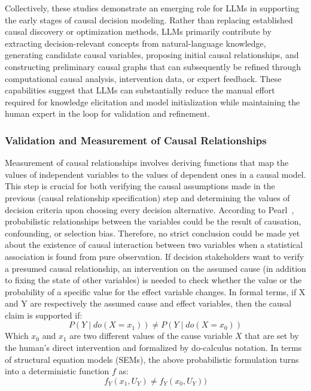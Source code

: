 \documentclass{sfuthesis}
\begin{document}
Collectively, these studies demonstrate an emerging role for LLMs in supporting the early stages of causal decision modeling. Rather than replacing established causal discovery or optimization methods, LLMs primarily contribute by extracting decision-relevant concepts from natural-language knowledge, generating candidate causal variables, proposing initial causal relationships, and constructing preliminary causal graphs that can subsequently be refined through computational causal analysis, intervention data, or expert feedback. These capabilities suggest that LLMs can substantially reduce the manual effort required for knowledge elicitation and model initialization while maintaining the human expert in the loop for validation and refinement.
\subsubsection{Validation and Measurement of Causal Relationships}
Measurement of causal relationships involves deriving functions that map the values of independent variables to the values of dependent ones in a causal model. This step is crucial for both verifying the causal assumptions made in the previous (causal relationship specification) step and determining the values of decision criteria upon choosing every decision alternative. According to Pearl~\cite{pearl_causal_2009}, probabilistic relationships between the variables could be the result of causation, confounding, or selection bias. Therefore, no strict conclusion could be made yet about the existence of causal interaction between two variables when a statistical association is found from pure observation. If decision stakeholders want to verify a presumed causal relationship, an intervention on the assumed cause (in addition to fixing the state of other variables) is needed to check whether the value or the probability of a specific value for the effect variable changes. In formal terms, if X and Y are respectively the assumed cause and effect variables, then the causal claim is supported if:
\begin{equation}
    P(Y\mid do(X=x_1 ) )\neq P(Y\mid do(X=x_0 ))
\end{equation}
Which $x_0$ and $x_1$ are two different values of the cause variable $X$ that are set by the human’s direct intervention and formalized by do-calculus notation. In terms of structural equation models (SEMs), the above probabilistic formulation turns into a deterministic function $f$ as:
\begin{equation}
    f_Y (x_1,U_Y)\neq f_Y (x_0,U_Y))
\end{equation}
\end{document}
